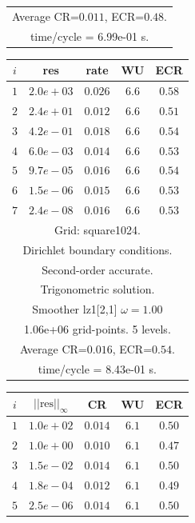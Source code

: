 \begin{table}[hbt]
\begin{center}
{\begin{tabular}{|c|c|c|c|c|}
\multicolumn{5}{|c|}{Average CR=$0.011$, ECR=$0.48$.}  \\
\multicolumn{5}{|c|}{time/cycle = 6.99e-01 s.}  \\
\hline 
\end{tabular}
\begin{tabular}{|c|c|c|c|c|} \hline 
 $i$   & res      & rate    &  WU    & ECR  \\   \hline 
 $ 1$  & $ 2.0e+03$ & $0.026$ & $ 6.6$ & $0.58$ \\ 
 $ 2$  & $ 2.4e+01$ & $0.012$ & $ 6.6$ & $0.51$ \\ 
 $ 3$  & $ 4.2e-01$ & $0.018$ & $ 6.6$ & $0.54$ \\ 
 $ 4$  & $ 6.0e-03$ & $0.014$ & $ 6.6$ & $0.53$ \\ 
 $ 5$  & $ 9.7e-05$ & $0.016$ & $ 6.6$ & $0.54$ \\ 
 $ 6$  & $ 1.5e-06$ & $0.015$ & $ 6.6$ & $0.53$ \\ 
 $ 7$  & $ 2.4e-08$ & $0.016$ & $ 6.6$ & $0.53$ \\ 
\hline 
\multicolumn{5}{|c|}{Grid: square1024.}  \\
\multicolumn{5}{|c|}{Dirichlet boundary conditions.}  \\
\multicolumn{5}{|c|}{Second-order accurate.}  \\
\multicolumn{5}{|c|}{Trigonometric solution.}  \\
\multicolumn{5}{|c|}{Smoother lz1[2,1] $\omega=1.00$}  \\
\multicolumn{5}{|c|}{1.06e+06 grid-points. 5 levels.}  \\
\multicolumn{5}{|c|}{Average CR=$0.016$, ECR=$0.54$.}  \\
\multicolumn{5}{|c|}{time/cycle = 8.43e-01 s.}  \\
\hline 
\end{tabular}
\begin{tabular}{|c|c|c|c|c|} \hline 
 $i$   & $\vert\vert\mbox{res}\vert\vert_\infty$  &  CR     &  WU    & ECR  \\   \hline 
 $ 1$  & $ 1.0e+02$ & $0.014$ & $ 6.1$ & $0.50$ \\ 
 $ 2$  & $ 1.0e+00$ & $0.010$ & $ 6.1$ & $0.47$ \\ 
 $ 3$  & $ 1.5e-02$ & $0.014$ & $ 6.1$ & $0.50$ \\ 
 $ 4$  & $ 1.8e-04$ & $0.012$ & $ 6.1$ & $0.49$ \\ 
 $ 5$  & $ 2.5e-06$ & $0.014$ & $ 6.1$ & $0.50$ \\ 

\end{tabular}}
\end{center}
\end{table}
